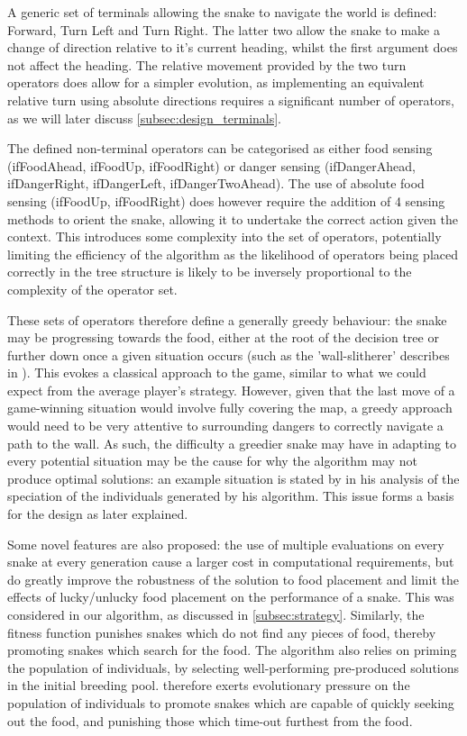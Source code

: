\documentclass[british,10pt,a4paper]{article}
\begin{document}
A generic set of terminals allowing the snake to navigate the world is defined: Forward, Turn Left and Turn Right. The latter two allow the snake to make a change of direction relative to it's current heading, whilst the first argument does not affect the heading. The relative movement provided by the two turn operators does allow for a simpler evolution, as implementing an equivalent relative turn using absolute directions requires a significant number of operators, as we will later discuss \autoref{subsec:design_terminals}. 

The defined non-terminal operators can be categorised as either food sensing (ifFoodAhead, ifFoodUp, ifFoodRight) or danger sensing (ifDangerAhead, ifDangerRight, ifDangerLeft, ifDangerTwoAhead). The use of absolute food sensing (ifFoodUp, ifFoodRight) does however require the addition of 4 sensing methods to orient the snake, allowing it to undertake the correct action given the context. This introduces some complexity into the set of operators, potentially limiting the efficiency of the algorithm as the likelihood of operators being placed correctly in the tree structure is likely to be inversely proportional to the complexity of the operator set.

These sets of operators therefore define a generally greedy behaviour: the snake may be progressing towards the food, either at the root of the decision tree or further down once a given situation occurs (such as the 'wall-slitherer' describes in \cite{Ehlis2000-sz}). This evokes a classical approach to the game, similar to what we could expect from the average player's strategy. However, given that the last move of a game-winning situation would involve fully covering the map, a greedy approach would need to be very attentive to surrounding dangers to correctly navigate a path to the wall. As such, the difficulty a greedier snake may have in adapting to every potential situation may be the cause for why the algorithm may not produce optimal solutions: an example situation is stated by \citeauthor{Ehlis2000-sz} in his analysis of the speciation of the individuals generated by his algorithm. This issue forms a basis for the design as later explained. 

Some novel features are also proposed: the use of multiple evaluations on every snake at every generation cause a larger cost in computational requirements, but do greatly improve the robustness of the solution to food placement and limit the effects of lucky/unlucky food placement on the performance of a snake. This was considered in our algorithm, as discussed in \autoref{subsec:strategy}. Similarly, the fitness function punishes snakes which do not find any pieces of food, thereby promoting snakes which search for the food. The algorithm also relies on priming the population of individuals, by selecting well-performing pre-produced solutions in the initial breeding pool. \citeauthor{Ehlis2000-sz} therefore exerts evolutionary pressure on the population of individuals to promote snakes which are capable of quickly seeking out the food, and punishing those which time-out furthest from the food.
\end{document}
